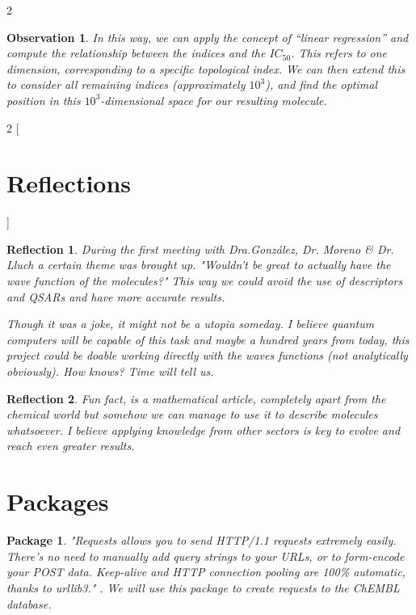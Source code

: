 \documentclass[12pt,letterpaper]{article}
\newtheorem{observation}{Observation}
\newtheorem{reflection}{Reflection}
\newtheorem{PyPackage}{Package}
\begin{document}
\begin{multicols}{2}
\begin{observation}
In this way, we can apply the concept of “linear regression” and compute the relationship between the indices and the $IC_{50}$. This refers to one dimension, corresponding to a specific topological index. We can then extend this to consider all remaining indices (approximately $10^3$), and find the optimal position in this $10^3$-dimensional space for our resulting molecule.
\end{observation}
\end{multicols}
\newpage


\begin{multicols}{2}
[
\section{Reflections}
]
\begin{reflection}
During the first meeting with Dra.González, Dr. Moreno \& Dr. Lluch a certain theme was brought up. "Wouldn't be great to actually have the wave function of the molecules?" This way we could avoid the use of descriptors and QSARs and have more accurate results. \par
Though it was a joke, it might not be a utopia someday. I believe quantum computers will be capable of this task and maybe a hundred years from today, this project could be doable working directly with the waves functions (not analytically obviously). How knows? Time will tell us.
\end{reflection}
\begin{reflection}
Fun fact, \cite{ZagrebIndicesArticle} is a mathematical article, completely apart from the chemical world but somehow we can manage to use it to describe molecules whatsoever. I believe applying knowledge from other sectors is key to evolve and reach even greater results.
\end{reflection}
\end{multicols}

\section{Packages}

\begin{PyPackage}
"Requests allows you to send HTTP/1.1 requests extremely easily. There’s no need to manually add query strings to your URLs, or to form-encode your POST data. Keep-alive and HTTP connection pooling are 100\% automatic, thanks to urllib3."
\cite{PythonPackageRequests}. We will use this package to create requests to the ChEMBL database.
\end{PyPackage}
\end{document}
